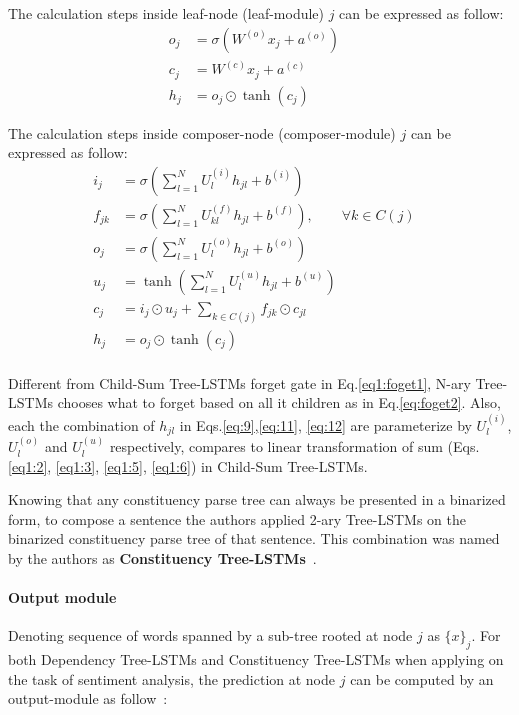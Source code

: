 The calculation steps inside leaf-node (leaf-module) \(j\) can be expressed as follow:
\begin{align}
    o_j &= \sigma{\left( W^{(o)} x_j + a^{\left(o\right)}\right)} & \\
       c_j &= W^{(c)} x_j + a^{(c)} & \\
    h_j &= o_j \odot \tanh{\left(c_j\right)} &
\end{align}

The calculation steps inside composer-node (composer-module) \(j\) can be expressed as follow:
\begin{align}
      i_j &= \sigma{ \left(\sum_{l=1}^{N}U_l^{(i)} h_{jl} + b^{(i)} \right) } &\label{eq:9}\\
      f_{jk} &= \sigma{\left(\sum_{l=1}^{N}U_{kl}^{\left(f\right)} h_{jl} + b^{\left(f\right)}\right)}, \qquad  \forall k \in C(j) & \label{eq:foget2}\\
      o_j &= \sigma{\left( \sum_{l=1}^{N}U_l^{\left(o\right)} h_{jl} + b^{\left(o\right)}\right)} &\label{eq:11}\\
      u_j &= \tanh{\left( \sum_{l=1}^{N}U_l^{\left(u\right)} h_{jl} + b^{\left(u\right)}\right)} &\label{eq:12}\\
       c_j &= i_j \odot u_j + \sum_{k \in C\left(j\right)} f_{jk} \odot c_{jl} & \\
    h_j &= o_j \odot \tanh{\left(c_j\right)} & \\
\end{align}

Different from Child-Sum Tree-LSTMs forget gate in Eq.\eqref{eq1:foget1}, N-ary Tree-LSTMs chooses what to forget based on all it children as in Eq.\eqref{eq:foget2}.
Also, each the combination of \(h_{jl}\) in Eqs.\eqref{eq:9},\eqref{eq:11}, \eqref{eq:12} are parameterize by \(U_l^{(i)}\), \(U_l^{(o)}\) and \(U_l^{(u)}\) respectively, compares to linear transformation of sum (Eqs.\eqref{eq1:2}, \eqref{eq1:3}, \eqref{eq1:5}, \eqref{eq1:6}) in Child-Sum Tree-LSTMs.

Knowing that any constituency parse tree can always be presented in a binarized form, to compose a sentence the authors applied 2-ary Tree-LSTMs on the binarized constituency parse tree of that sentence.
This combination was named by the authors as \textbf{Constituency Tree-LSTMs}~\cite{treeLSTM}.

\paragraph{Output module} Denoting sequence of words spanned by a sub-tree rooted at node \(j\) as \(\{x\}_j\).
For both Dependency Tree-LSTMs and Constituency Tree-LSTMs when applying on the task of sentiment analysis, the prediction at node \(j\) can be computed by an output-module as follow~\cite{treeLSTM}:

